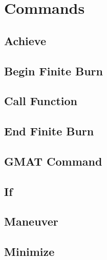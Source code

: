\chapter{Commands}

\section{Achieve}


\section{Begin Finite Burn}


\section{Call Function}


\section{End Finite Burn}


\section{GMAT Command}


\section{If}


\section{Maneuver}


\section{Minimize}


